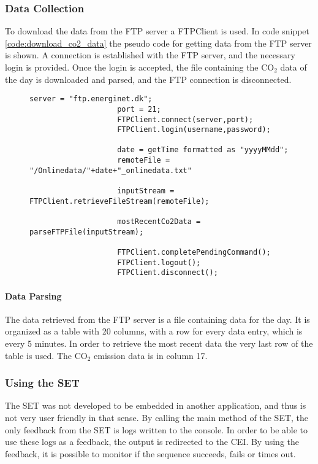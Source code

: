 \documentclass[Main]{subfiles}
\begin{document}
		\subsubsection{Data Collection}
		\label{sub:data_collection}
			To download the data from the FTP server a FTPClient\cite{FTPClient:Online} is used. 
			In code snippet \ref{code:download_co2_data} the pseudo code for getting data from the FTP server is shown. 
			A connection is established with the FTP server, and the necessary login is provided.
			Once the login is accepted, the file containing the CO$_2$ data of the day is downloaded and parsed, and the FTP connection is disconnected.

			\begin{figure}[H]
				\begin{lstlisting}[caption=Download CO2 data, style=Code-C, label=code:download_co2_data]
					server = "ftp.energinet.dk";
					port = 21;
					FTPClient.connect(server,port);
					FTPClient.login(username,password);

					date = getTime formatted as "yyyyMMdd";
					remoteFile = "/Onlinedata/"+date+"_onlinedata.txt"

					inputStream = FTPClient.retrieveFileStream(remoteFile);

					mostRecentCo2Data = parseFTPFile(inputStream);

					FTPClient.completePendingCommand();
					FTPClient.logout();
					FTPClient.disconnect();
				\end{lstlisting}
			\end{figure}


			\paragraph{Data Parsing} %
			\label{par:data_parsing}
				The data retrieved from the FTP server is a file containing data for the day. 
				It is organized as a table with 20 columns, with a row for every data entry, which is every 5 minutes.
				In order to retrieve the most recent data the very last row of the table is used.
				The CO$_2$ emission data is in column 17.

		\subsubsection{Using the SET} %
		\label{sub:using_sequence_executor_tool}
			The SET was not developed to be embedded in another application, and thus is not very user friendly in that sense.
			By calling the main method of the SET, the only feedback from the SET is logs written to the console. 
			In order to be able to use these logs as a feedback, the output is redirected to the CEI.
			By using the feedback, it is possible to monitor if the sequence succeeds, fails or times out.
\end{document}
